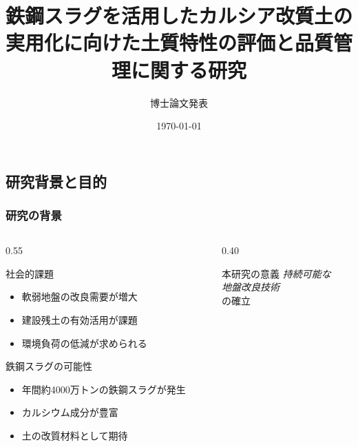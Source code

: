 \documentclass[unicode, 9pt, aspectratio=43]{beamer}
\title{鉄鋼スラグを活用したカルシア改質土の\\実用化に向けた土質特性の評価と品質管理に関する研究}
\author{博士論文発表}
\institute{京都大学大学院 工学研究科}
\date{\today}
\begin{document}
\newcommand{\NoTranslate}[1]{#1}
\pdfstringdefDisableCommands{\let\translate\NoTranslate}

\begin{refsection}

  \maketitle

  \section{研究背景と目的}

  \begin{frame}
    \frametitle{研究の背景}
    \begin{columns}
      \begin{column}{0.55\linewidth}
        \begin{block}{社会的課題}
          \begin{itemize}
            \item 軟弱地盤の改良需要が増大
            \item 建設残土の有効活用が課題
            \item 環境負荷の低減が求められる\cite{slag_stabilization}
          \end{itemize}
        \end{block}
        \begin{alertblock}{鉄鋼スラグの可能性}
          \begin{itemize}
            \item 年間約4000万トンの鉄鋼スラグが発生
            \item カルシウム成分が豊富
            \item 土の改質材料として期待
          \end{itemize}
        \end{alertblock}
      \end{column}

      \begin{column}{0.40\linewidth}
        \begin{exampleblock}{本研究の意義}
          \centering
          \Large
          \emph{持続可能な}\\
          \emph{地盤改良技術}\\
          \vspace{0.5em}
          の確立
        \end{exampleblock}


\end{column}
\end{columns}
\end{frame}
\end{refsection}
\end{document}

